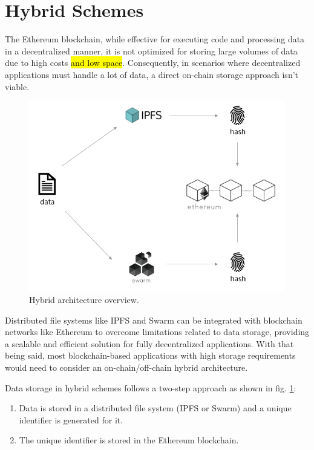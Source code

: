 \section{Hybrid Schemes}\label{sec:}
The Ethereum blockchain, while effective for executing code and processing data in a decentralized manner, it is not optimized for storing large volumes of data due to high costs \hl{and low space}. Consequently, in scenarios where decentralized applications must handle a lot of data, a direct on-chain storage approach isn't viable.

\begin{figure}[htbp]
\centerline{\includegraphics[width=12cm]{figs/hybrid.png}}
\caption{Hybrid architecture overview.}
\label{fig: hybrid}
\end{figure}

Distributed file systems like IPFS and Swarm can be integrated with blockchain networks like Ethereum to overcome limitations related to data storage, providing a scalable and efficient solution for fully decentralized applications. With that being said, most blockchain-based applications with high storage requirements would need to consider an on-chain/off-chain hybrid architecture.

Data storage in hybrid schemes follows a two-step approach as shown in fig. \ref{fig: hybrid}:
\begin{enumerate}
\item Data is stored in a distributed file system (IPFS or Swarm) and a unique identifier is generated for it.
\item The unique identifier is stored in the Ethereum blockchain.
\end{enumerate}

